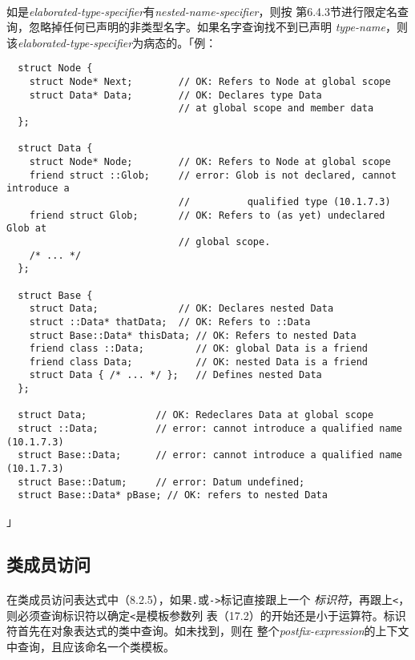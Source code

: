 \paragraph{}
如是\textit{elaborated-type-specifier}有\textit{nested-name-specifier}，则按
第6.4.3节进行限定名查询，忽略掉任何已声明的非类型名字。如果名字查询找不到已声明
\textit{type-name}，则该\textit{elaborated-type-specifier}为病态的。「例：
\begin{lstlisting}
  struct Node {
    struct Node* Next;        // OK: Refers to Node at global scope
    struct Data* Data;        // OK: Declares type Data
                              // at global scope and member data
  };

  struct Data {
    struct Node* Node;        // OK: Refers to Node at global scope
    friend struct ::Glob;     // error: Glob is not declared, cannot introduce a
                              //          qualified type (10.1.7.3)
    friend struct Glob;       // OK: Refers to (as yet) undeclared Glob at
                              // global scope.
    /* ... */
  };

  struct Base {
    struct Data;              // OK: Declares nested Data
    struct ::Data* thatData;  // OK: Refers to ::Data
    struct Base::Data* thisData; // OK: Refers to nested Data
    friend class ::Data;         // OK: global Data is a friend
    friend class Data;           // OK: nested Data is a friend
    struct Data { /* ... */ };   // Defines nested Data
  };

  struct Data;            // OK: Redeclares Data at global scope
  struct ::Data;          // error: cannot introduce a qualified name (10.1.7.3)
  struct Base::Data;      // error: cannot introduce a qualified name (10.1.7.3)
  struct Base::Datum;     // error: Datum undefined;
  struct Base::Data* pBase; // OK: refers to nested Data
\end{lstlisting}」

\subsection{类成员访问}
\paragraph{}
在类成员访问表达式中（8.2.5），如果\texttt{.}或\texttt{->}标记直接跟上一个
\textit{标识符}，再跟上\texttt{<}，则必须查询标识符以确定\texttt{<}是模板参数列
表（17.2）的开始还是小于运算符。标识符首先在对象表达式的类中查询。如未找到，则在
整个\textit{postfix-expression}的上下文中查询，且应该命名一个类模板。

